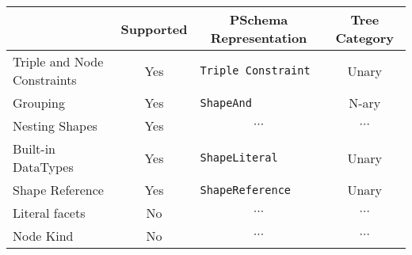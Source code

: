 \vspace*{0.5em}

\begin{table}[ht]
    \centering
    \begin{tabular}{|l|c|l|c|}
        \hline
        \rowcolor[HTML]{EFEFEF}
        \multicolumn{1}{|c|}{\cellcolor[HTML]{EFEFEF}\textbf{Feature}} & \textbf{Supported}         & \multicolumn{1}{c|}{\cellcolor[HTML]{EFEFEF}\textbf{PSchema Representation}} & \multicolumn{1}{c|}{\cellcolor[HTML]{EFEFEF}\textbf{Tree Category}} \\ \hline
        Triple and Node Constraints                                    & {\color[HTML]{009901} Yes} & \texttt{Triple Constraint}                                                   & Unary                                                               \\ \hline
        Grouping                                                       & {\color[HTML]{009901} Yes} & \texttt{ShapeAnd}                                                            & N-ary                                                               \\ \hline
        Nesting Shapes                                                 & {\color[HTML]{009901} Yes} & \multicolumn{1}{c|}{$\cdots$}                                                & \multicolumn{1}{c|}{$\cdots$}                                       \\ \hline
        Built-in DataTypes                                             & {\color[HTML]{009901} Yes} & \texttt{ShapeLiteral}                                                        & Unary                                                               \\ \hline
        Shape Reference                                                & {\color[HTML]{009901} Yes} & \texttt{ShapeReference}                                                      & Unary                                                               \\ \hline
        Literal facets                                                 & {\color[HTML]{FE0000} No}  & \multicolumn{1}{c|}{$\cdots$}                                                & \multicolumn{1}{c|}{$\cdots$}                                       \\ \hline
        Node Kind                                                      & {\color[HTML]{FE0000} No}  & \multicolumn{1}{c|}{$\cdots$}                                                & \multicolumn{1}{c|}{$\cdots$}                                       \\ \hline

\end{tabular}
\end{table}
